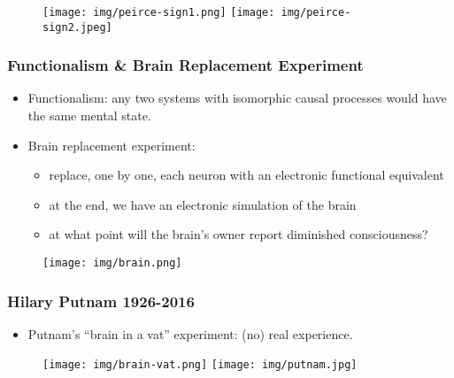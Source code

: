 \documentclass[UTF8,11pt,colorlinks,compress,openany]{beamer}%
\begin{document}
\begin{frame}\frametitle{}
\begin{figure}[H]
\texttt{[image: img/peirce-sign1.png]}
\texttt{[image: img/peirce-sign2.jpeg]}
\end{figure}
\end{frame}

\begin{frame}\frametitle{Functionalism \& Brain Replacement Experiment}
\begin{itemize}
	\item Functionalism: any two systems with isomorphic causal processes would have the same mental state.
	\item Brain replacement experiment:
		\begin{itemize}
			\item replace, one by one, each neuron with an electronic functional equivalent
			\item at the end, we have an electronic simulation of the brain
			\item at what point will the brain's owner report diminished consciousness?
		\end{itemize}
\end{itemize}
\begin{figure}[H]
\texttt{[image: img/brain.png]}
\end{figure}
\end{frame}

\begin{frame}\frametitle{Hilary Putnam 1926-2016}
\begin{itemize}
	\item Putnam's ``brain in a vat'' experiment: (no) real experience.
\end{itemize}
\begin{figure}
\texttt{[image: img/brain-vat.png]}
\texttt{[image: img/putnam.jpg]}
\end{figure}
\end{frame}
\end{document}
